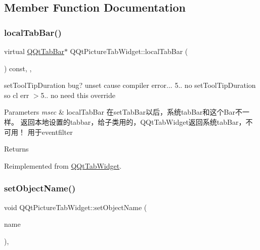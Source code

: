 \subsection{Member Function Documentation}
\mbox{\label{class_q_qt_picture_tab_widget_a75be29bbbc547eae8677eac9de7877b8}} 
\subsubsection{\texorpdfstring{local\+Tab\+Bar()}{localTabBar()}}
{\footnotesize\ttfamily virtual \mbox{\hyperlink{class_q_qt_tab_bar}{Q\+Qt\+Tab\+Bar}}$\ast$ Q\+Qt\+Picture\+Tab\+Widget\+::local\+Tab\+Bar (\begin{DoxyParamCaption}{ }\end{DoxyParamCaption}) const\hspace{0.3cm}{\ttfamily [inline]}, {\ttfamily [override]}, {\ttfamily [virtual]}}



set\+Tool\+Tip\+Duration bug? unset cause compiler error... 5.. no set\+Tool\+Tip\+Duration so cl err $>$5.. no need this override 


\begin{DoxyParams}{Parameters}
{\em msec} & local\+Tab\+Bar 在set\+Tab\+Bar以后，系统tab\+Bar和这个\+Bar不一样。 返回本地设置的tabbar，给子类用的，\+Q\+Qt\+Tab\+Widget返回系统tab\+Bar，不可用！ 用于eventfilter \\
\hline
\end{DoxyParams}
\begin{DoxyReturn}{Returns}

\end{DoxyReturn}


Reimplemented from \mbox{\hyperlink{class_q_qt_tab_widget_a53183c40775ba6e7142f429edfd75d9c}{Q\+Qt\+Tab\+Widget}}.

\mbox{\label{class_q_qt_picture_tab_widget_ae7ac85c464230644bf9be4a5a636f6b4}} 
\subsubsection{\texorpdfstring{set\+Object\+Name()}{setObjectName()}}
{\footnotesize\ttfamily void Q\+Qt\+Picture\+Tab\+Widget\+::set\+Object\+Name (\begin{DoxyParamCaption}\item[{const Q\+String \&}]{name }\end{DoxyParamCaption})\hspace{0.3cm}{\ttfamily [override]}, {\ttfamily [virtual]}}



